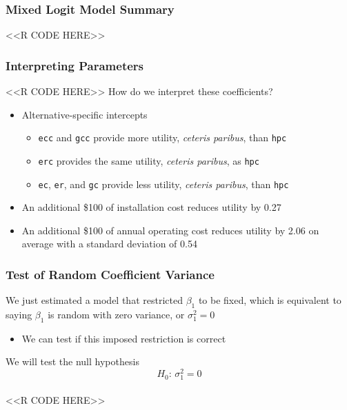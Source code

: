\documentclass{beamer}
\begin{document}
\begin{frame}[fragile]\frametitle{Mixed Logit Model Summary}
	\vspace{1ex}
    <<R CODE HERE>>
\end{frame}

\begin{frame}[fragile]\frametitle{Interpreting Parameters}
    <<R CODE HERE>>
    \vspace{2ex}
    How do we interpret these coefficients?
    \begin{itemize}
    	\item Alternative-specific intercepts
    	\begin{itemize}
    		\item \texttt{ecc} and \texttt{gcc} provide more utility, \emph{ceteris paribus}, than \texttt{hpc}
	        \item \texttt{erc} provides the same utility, \emph{ceteris paribus}, as \texttt{hpc}
	        \item \texttt{ec}, \texttt{er}, and \texttt{gc} provide less utility, \emph{ceteris paribus}, than \texttt{hpc}
    	\end{itemize}
        \item An additional \$100 of installation cost reduces utility by 0.27
        \item An additional \$100 of annual operating cost reduces utility by 2.06 on average with a standard deviation of 0.54
    \end{itemize}
\end{frame}

\begin{frame}[fragile]\frametitle{Test of Random Coefficient Variance}
	We just estimated a model that restricted $\beta_1$ to be fixed, which is equivalent to saying $\beta_1$ is random with zero variance, or $\sigma_1^2 = 0$
	\begin{itemize}
		\item We can test if this imposed restriction is correct
	\end{itemize}
    \vspace{3ex}
    We will test the null hypothesis
    $$H_0 \text{: } \sigma_1^2 = 0$$ \\
    <<R CODE HERE>>
\end{frame}
\end{document}
